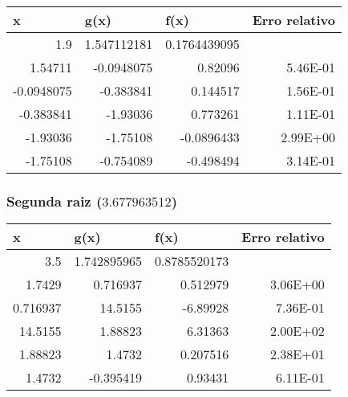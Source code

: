 \documentclass[12pt]{article}
\begin{document}
\begin{table}[H]
\centering
\begin{tabular}{@{}rrrr@{}}
\toprule
\multicolumn{1}{l}{x} & \multicolumn{1}{l}{g(x)} & \multicolumn{1}{l}{f(x)} & \multicolumn{1}{l}{Erro relativo} \\ \midrule
1.9                   & 1.547112181              & 0.1764439095             & \multicolumn{1}{l}{}              \\
1.54711               & -0.0948075               & 0.82096                  & 5.46E-01                          \\
-0.0948075            & -0.383841                & 0.144517                 & 1.56E-01                          \\
-0.383841             & -1.93036                 & 0.773261                 & 1.11E-01                          \\
-1.93036              & -1.75108                 & -0.0896433               & 2.99E+00                          \\
-1.75108              & -0.754089                & -0.498494                & 3.14E-01                         \\ \bottomrule
\end{tabular}
\end{table}

\subsubsection{Segunda raiz (\(3.677963512\))}

\begin{table}[H]
\centering
\begin{tabular}{@{}rrrr@{}}
\toprule
\multicolumn{1}{l}{x} & \multicolumn{1}{l}{g(x)} & \multicolumn{1}{l}{f(x)} & \multicolumn{1}{l}{Erro relativo} \\ \midrule
3.5                   & 1.742895965              & 0.8785520173             & \multicolumn{1}{l}{}              \\
1.7429                & 0.716937                 & 0.512979                 & 3.06E+00                          \\
0.716937              & 14.5155                  & -6.89928                 & 7.36E-01                          \\
14.5155               & 1.88823                  & 6.31363                  & 2.00E+02                          \\
1.88823               & 1.4732                   & 0.207516                 & 2.38E+01                          \\
1.4732                & -0.395419                & 0.93431                  & 6.11E-01                         \\ \bottomrule
\end{tabular}
\end{table}
\end{document}
